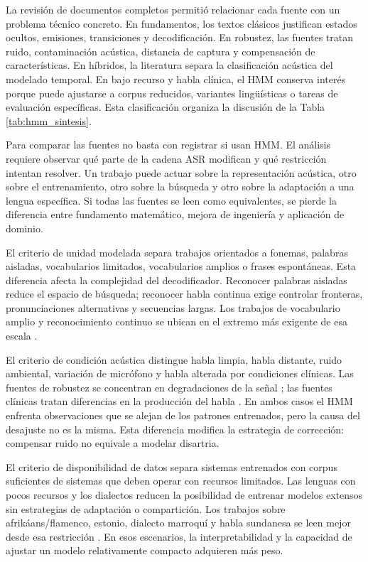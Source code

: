 La revisión de documentos completos permitió relacionar cada fuente con un problema técnico concreto. En fundamentos, los textos clásicos justifican estados ocultos, emisiones, transiciones y decodificación. En robustez, las fuentes tratan ruido, contaminación acústica, distancia de captura y compensación de características. En híbridos, la literatura separa la clasificación acústica del modelado temporal. En bajo recurso y habla clínica, el HMM conserva interés porque puede ajustarse a corpus reducidos, variantes lingüísticas o tareas de evaluación específicas. Esta clasificación organiza la discusión de la Tabla \ref{tab:hmm_sintesis}.


Para comparar las fuentes no basta con registrar si usan HMM. El análisis requiere observar qué parte de la cadena ASR modifican y qué restricción intentan resolver. Un trabajo puede actuar sobre la representación acústica, otro sobre el entrenamiento, otro sobre la búsqueda y otro sobre la adaptación a una lengua específica. Si todas las fuentes se leen como equivalentes, se pierde la diferencia entre fundamento matemático, mejora de ingeniería y aplicación de dominio.

El criterio de unidad modelada separa trabajos orientados a fonemas, palabras aisladas, vocabularios limitados, vocabularios amplios o frases espontáneas. Esta diferencia afecta la complejidad del decodificador. Reconocer palabras aisladas reduce el espacio de búsqueda; reconocer habla continua exige controlar fronteras, pronunciaciones alternativas y secuencias largas. Los trabajos de vocabulario amplio y reconocimiento continuo se ubican en el extremo más exigente de esa escala \cite{Lee1990SpeechRecogn,ilingas2004SpecifHidden}.

El criterio de condición acústica distingue habla limpia, habla distante, ruido ambiental, variación de micrófono y habla alterada por condiciones clínicas. Las fuentes de robustez se concentran en degradaciones de la señal \cite{Vaseghi1997NoiseCompen,Matassoni2002HiddenMarkov}; las fuentes clínicas tratan diferencias en la producción del habla \cite{Lee2019AssessDysart}. En ambos casos el HMM enfrenta observaciones que se alejan de los patrones entrenados, pero la causa del desajuste no es la misma. Esta diferencia modifica la estrategia de corrección: compensar ruido no equivale a modelar disartria.

El criterio de disponibilidad de datos separa sistemas entrenados con corpus suficientes de sistemas que deben operar con recursos limitados. Las lenguas con pocos recursos y los dialectos reducen la posibilidad de entrenar modelos extensos sin estrategias de adaptación o compartición. Los trabajos sobre afrikáans/flamenco, estonio, dialecto marroquí y habla sundanesa se leen mejor desde esa restricción \cite{DeWet2017SpeechRecogn,Alume2004LimiteVocabu,Mouaz2019SpeechRecogn,Yulita2018FeaturExtrac}. En esos escenarios, la interpretabilidad y la capacidad de ajustar un modelo relativamente compacto adquieren más peso.

